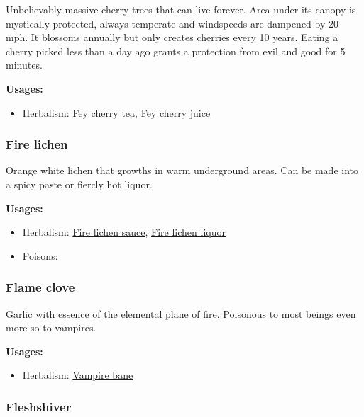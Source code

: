 Unbelievably massive cherry trees that can live forever. Area under its canopy is mystically protected, always temperate and windspeeds are dampened by 20 mph. It blossoms annually but only creates cherries every 10 years. Eating a cherry picked less than a day ago grants a protection from evil and good for 5 minutes.

\vspace{5mm}

\textbf{Usages:}

\begin{itemize}[noitemsep]
\item[] Herbalism: \hyperref[Fey cherry tea]{Fey cherry tea}, \hyperref[Fey cherry juice]{Fey cherry juice}
\end{itemize}

\subsubsection{Fire lichen}
\label{Fire lichen}

Orange white lichen that growths in warm underground areas. Can be made into a spicy paste or fiercly hot liquor.

\vspace{5mm}

\textbf{Usages:}

\begin{itemize}[noitemsep]
\item[] Herbalism: \hyperref[Fire lichen sauce]{Fire lichen sauce}, \hyperref[Fire lichen liquor]{Fire lichen liquor}
\item[] Poisons: \poison
\end{itemize}

\subsubsection{Flame clove}
\label{Flame clove}

Garlic with essence of the elemental plane of fire. Poisonous to most beings even more so to vampires.

\vspace{5mm}

\textbf{Usages:}

\begin{itemize}[noitemsep]
\item[] Herbalism: \hyperref[Vampire bane]{Vampire bane}
\end{itemize}

\subsubsection{Fleshshiver}
\label{Fleshshiver}


